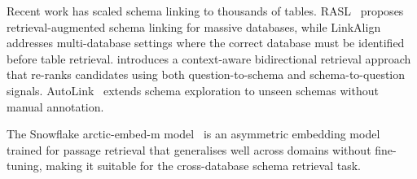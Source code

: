 Recent work has scaled schema linking to thousands of tables.
RASL~\citep{eben2025rasl} proposes retrieval-augmented schema linking for
massive databases, while LinkAlign~\citep{wang2025linkalign} addresses
multi-database settings where the correct database must be identified before
table retrieval.
\citet{nahid2025rethinking} introduces a context-aware bidirectional retrieval
approach that re-ranks candidates using both question-to-schema and
schema-to-question signals.
AutoLink~\citep{wang2025autolink} extends schema exploration to unseen schemas
without manual annotation.

The Snowflake arctic-embed-m model~\citep{merrick2024arctic} is an asymmetric
embedding model trained for passage retrieval that generalises well
across domains without fine-tuning, making it suitable for the
cross-database schema retrieval task.
